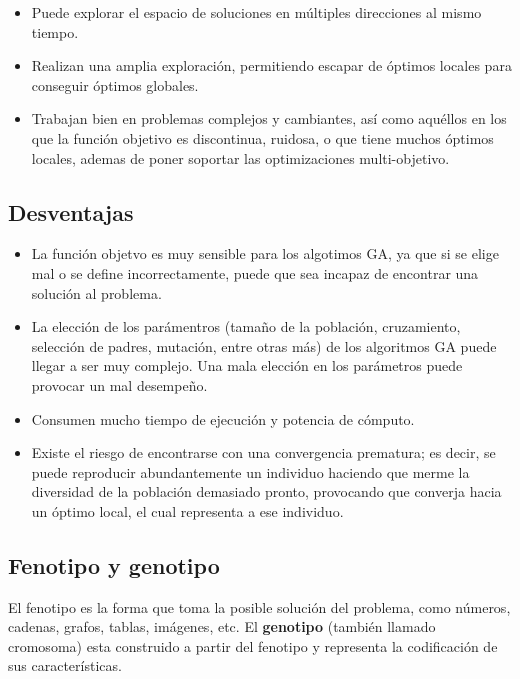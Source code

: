 \documentclass[12pt,twoside]{article}
\begin{document}
	\begin{itemize}
		\item Puede explorar el espacio de soluciones en múltiples direcciones al mismo tiempo.
		\item Realizan una amplia exploración, permitiendo escapar de óptimos locales para conseguir óptimos globales.
		\item Trabajan bien en problemas complejos y cambiantes, así como aquéllos en los que la función objetivo es discontinua, ruidosa, o que tiene muchos óptimos locales, ademas de poner soportar las optimizaciones multi-objetivo.
	\end{itemize}
	
	\subsection{Desventajas}
	
	\begin{itemize}
		\item La función objetvo es muy sensible para los algotimos GA, ya que si se elige mal o se define incorrectamente, puede que sea incapaz de encontrar una solución al problema.
		\item La elección de los parámentros (tamaño de la población, cruzamiento, selección de padres, mutación, entre otras más) de los algoritmos GA puede llegar a ser muy complejo. Una mala elección en los parámetros puede provocar un mal desempeño.
		\item Consumen mucho tiempo de ejecución y potencia de cómputo.
		\item Existe el riesgo de encontrarse con una convergencia prematura; es decir, se puede reproducir abundantemente un individuo haciendo que merme la diversidad de la población demasiado pronto, provocando que converja hacia un óptimo local, el cual representa a ese individuo.
	\end{itemize}
	
	\subsection{Fenotipo y genotipo}
	
	El fenotipo es la forma que toma la posible solución del problema, como números, cadenas, grafos, tablas, imágenes, etc. El \textbf{genotipo} (también llamado cromosoma) esta construido a partir del fenotipo y representa la codificación de sus características.
	
\end{document}
